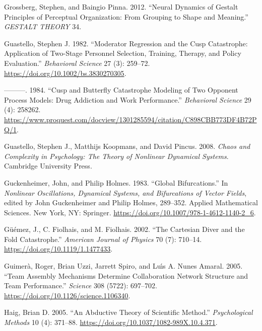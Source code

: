 \documentclass[
  a4paper,
  DIV=11,
  numbers=noendperiod,
  oneside]{scrreprt}
\newlength{\cslhangindent}
\newenvironment{CSLReferences}[2] %
 {\begin{list}{}{%
  \setlength{\itemindent}{0pt}
  \setlength{\leftmargin}{0pt}
  \setlength{\parsep}{0pt}
  \ifodd #1
   \setlength{\leftmargin}{\cslhangindent}
   \setlength{\itemindent}{-1\cslhangindent}
  \fi
  \setlength{\itemsep}{#2\baselineskip}}}
 {\end{list}}
\begin{document}
\begin{CSLReferences}{1}{0}
Grossberg, Stephen, and Baingio Pinna. 2012. {``Neural {Dynamics} of
{Gestalt Principles} of {Perceptual Organization}: {From Grouping} to
{Shape} and {Meaning}.''} \emph{GESTALT THEORY} 34.

Guastello, Stephen J. 1982. {``Moderator Regression and the Cusp
Catastrophe: {Application} of Two-Stage Personnel Selection, Training,
Therapy, and Policy Evaluation.''} \emph{Behavioral Science} 27 (3):
259--72. \url{https://doi.org/10.1002/bs.3830270305}.

---------. 1984. {``Cusp and Butterfly Catastrophe Modeling of Two
Opponent Process Models: Drug Addiction and Work Performance.''}
\emph{Behavioral Science} 29 (4): 258262.
\url{https://www.proquest.com/docview/1301285594/citation/C898CBB773DF4B72PQ/1}.

Guastello, Stephen J., Matthijs Koopmans, and David Pincus. 2008.
\emph{Chaos and {Complexity} in {Psychology}: {The Theory} of {Nonlinear
Dynamical Systems}}. {Cambridge University Press}.

Guckenheimer, John, and Philip Holmes. 1983. {``Global
{Bifurcations}.''} In \emph{Nonlinear {Oscillations}, {Dynamical
Systems}, and {Bifurcations} of {Vector Fields}}, edited by John
Guckenheimer and Philip Holmes, 289--352. Applied {Mathematical
Sciences}. {New York, NY}: {Springer}.
\url{https://doi.org/10.1007/978-1-4612-1140-2_6}.

Güémez, J., C. Fiolhais, and M. Fiolhais. 2002. {``The {Cartesian} Diver
and the Fold Catastrophe.''} \emph{American Journal of Physics} 70 (7):
710--14. \url{https://doi.org/10.1119/1.1477433}.

Guimerà, Roger, Brian Uzzi, Jarrett Spiro, and Luı́s A. Nunes Amaral.
2005. {``Team {Assembly Mechanisms Determine Collaboration Network
Structure} and {Team Performance}.''} \emph{Science} 308 (5722):
697--702. \url{https://doi.org/10.1126/science.1106340}.

Haig, Brian D. 2005. {``An Abductive Theory of Scientific Method.''}
\emph{Psychological Methods} 10 (4): 371--88.
\url{https://doi.org/10.1037/1082-989X.10.4.371}.


\end{CSLReferences}
\end{document}

